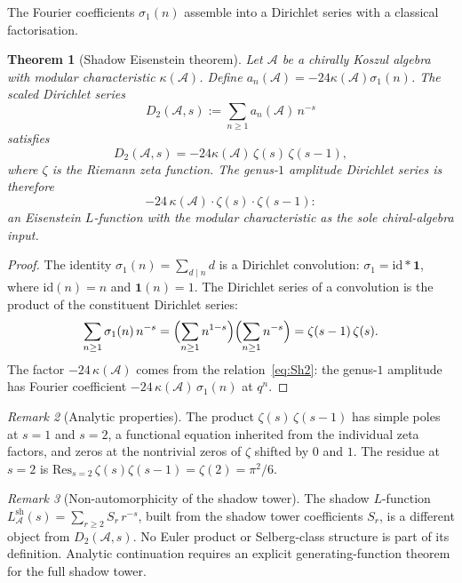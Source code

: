 \documentclass[11pt,reqno]{amsart}
\newtheorem{theorem}{Theorem}[section]
\theoremstyle{definition}
\theoremstyle{remark}
\newtheorem{remark}[theorem]{Remark}
\providecommand{\cA}{\mathcal{A}}
\providecommand{\sh}{\mathrm{sh}}
\providecommand{\id}{\mathrm{id}}
\numberwithin{equation}{section}
\begin{document}
The Fourier coefficients $\sigma_1(n)$ assemble into a Dirichlet
series with a classical factorisation.

\begin{theorem}[Shadow Eisenstein theorem]\label{thm:shadow-eisenstein-standalone}
  Let $\cA$ be a chirally Koszul algebra with modular
	  characteristic $\kappa(\cA)$. Define
	  $a_n(\cA)=-24\kappa(\cA)\sigma_1(n)$. The scaled Dirichlet series
	  \begin{equation}\label{eq:D2}
	    D_2(\cA, s)
	    := \sum_{n \ge 1} a_n(\cA)\, n^{-s}
	  \end{equation}
	  satisfies
	  \begin{equation}\label{eq:D2-factored}
	    D_2(\cA, s)
	    = -24\kappa(\cA)\,\zeta(s)\,\zeta(s - 1),
  \end{equation}
  where $\zeta$ is the Riemann zeta function. The genus-$1$
  amplitude Dirichlet series is therefore
  \begin{equation}\label{eq:genus1-dirichlet}
    -24\,\kappa(\cA) \cdot \zeta(s) \cdot \zeta(s - 1):
  \end{equation}
  an Eisenstein $L$-function with the modular characteristic as the
  sole chiral-algebra input.
\end{theorem}

\begin{proof}
  The identity $\sigma_1(n) = \sum_{d \mid n} d$ is a Dirichlet
  convolution: $\sigma_1 = \id * \mathbf{1}$, where
  $\id(n) = n$ and $\mathbf{1}(n) = 1$. The Dirichlet series of a
  convolution is the product of the constituent Dirichlet series:
  \[
    \sum_{n \ge 1} \sigma_1(n)\, n^{-s}
    = \Bigl(\sum_{n \ge 1} n^{1-s}\Bigr)
      \Bigl(\sum_{n \ge 1} n^{-s}\Bigr)
    = \zeta(s - 1)\,\zeta(s).
  \]
  The factor $-24\,\kappa(\cA)$ comes from the
  relation~\eqref{eq:Sh2}: the genus-$1$ amplitude has Fourier
  coefficient $-24\,\kappa(\cA)\,\sigma_1(n)$ at $q^n$.
\end{proof}

\begin{remark}[Analytic properties]\label{rem:D2-analytic}
  The product $\zeta(s)\,\zeta(s-1)$ has simple poles at $s = 1$
  and $s = 2$, a functional equation inherited from the individual
  zeta factors, and zeros at the nontrivial zeros of $\zeta$ shifted
  by $0$ and $1$. The residue at $s = 2$ is
  $\mathrm{Res}_{s=2}\,\zeta(s)\zeta(s-1)=\zeta(2)=\pi^2/6$.
\end{remark}

\begin{remark}[Non-automorphicity of the shadow tower]
  \label{rem:non-automorphic}
  The shadow $L$-function
  $L^{\sh}_\cA(s) = \sum_{r \ge 2} S_r\, r^{-s}$, built from the
  shadow tower coefficients $S_r$, is a different object from
  $D_2(\cA,s)$. No Euler product or Selberg-class structure is part
  of its definition. Analytic continuation requires an explicit
  generating-function theorem for the full shadow tower.
\end{remark}
\end{document}
